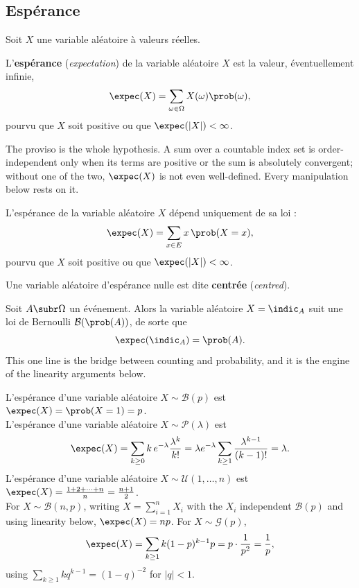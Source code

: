 \subsection{Espérance}

Soit $X$ une variable aléatoire à valeurs réelles.

\begin{definition}[Espérance]
  L'\textbf{espérance} (\textit{expectation}) de la variable aléatoire $X$ est la
  valeur, éventuellement infinie,
  \[ \expec(X) = \sum_{\omega \in \Omega} X(\omega)\prob(\omega), \]
  pourvu que $X$ soit positive ou que $\expec(|X|) < \infty$.
\end{definition}

The proviso is the whole hypothesis. A sum over a countable index set is
order-independent only when its terms are positive or the sum is absolutely
convergent; without one of the two, $\expec(X)$ is not even well-defined. Every
manipulation below rests on it.

\begin{prop}
  L'espérance de la variable aléatoire $X$ dépend uniquement de sa loi :
  \[ \expec(X) = \sum_{x \in E} x \, \prob(X = x), \]
  pourvu que $X$ soit positive ou que $\expec(|X|) < \infty$.
\end{prop}

Une variable aléatoire d'espérance nulle est dite \textbf{centrée}
(\textit{centred}).

\begin{example}
  Soit $A \subr \Omega$ un événement. Alors la variable aléatoire
  $X = \indic_{A}$ suit une loi de Bernoulli $\mathcal{B}(\prob(A))$, de sorte
  que
  \[ \expec(\indic_{A}) = \prob(A). \]
  This one line is the bridge between counting and probability, and it is the
  engine of the linearity arguments below.
\end{example}

\begin{example}
  L'espérance d'une variable aléatoire $X \sim \mathcal{B}(p)$ est
  $\expec(X) = \prob(X=1) = p$.\\

  L'espérance d'une variable aléatoire $X \sim \mathcal{P}(\lambda)$ est
  \[ \expec(X) = \sum_{k \ge 0} k\, e^{-\lambda} \frac{\lambda^{k}}{k!}
       = \lambda e^{-\lambda} \sum_{k \ge 1} \frac{\lambda^{k-1}}{(k-1)!}
       = \lambda. \]
  L'espérance d'une variable aléatoire $X \sim \mathcal{U}(1,\dots,n)$ est
  $\expec(X) = \frac{1+2+\dots+n}{n} = \frac{n+1}{2}$.\\

  For $X \sim \mathcal{B}(n,p)$, writing $X = \sum_{i=1}^{n} X_{i}$ with the
  $X_{i}$ independent $\mathcal{B}(p)$ and using linearity below,
  $\expec(X) = np$. For $X \sim \mathcal{G}(p)$,
  \[ \expec(X) = \sum_{k \ge 1} k(1-p)^{k-1} p
       = p \cdot \frac{1}{p^{2}} = \frac{1}{p}, \]
  using $\sum_{k \ge 1} k q^{k-1} = (1-q)^{-2}$ for $|q| < 1$.
\end{example}

